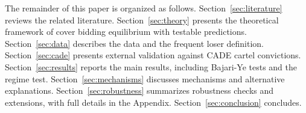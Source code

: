 The remainder of this paper is organized as follows. Section~\ref{sec:literature} reviews the related literature. Section~\ref{sec:theory} presents the theoretical framework of cover bidding equilibrium with testable predictions. Section~\ref{sec:data} describes the data and the frequent loser definition. Section~\ref{sec:cade} presents external validation against CADE cartel convictions. Section~\ref{sec:results} reports the main results, including Bajari-Ye tests and the regime test. Section~\ref{sec:mechanisms} discusses mechanisms and alternative explanations. Section~\ref{sec:robustness} summarizes robustness checks and extensions, with full details in the Appendix. Section~\ref{sec:conclusion} concludes.
